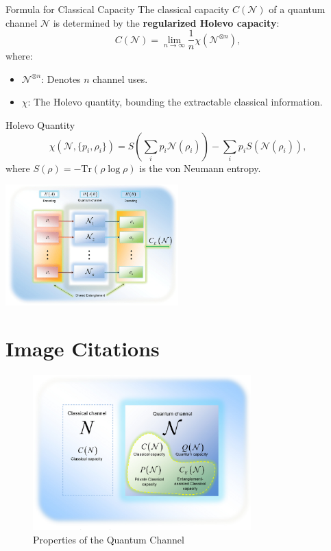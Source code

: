 \begin{frame}{Formula for Classical Capacity}
    The classical capacity \( C(\mathcal{N}) \) of a quantum channel \( \mathcal{N} \) is determined by the \textbf{regularized Holevo capacity}:
    \begin{equation}
        C(\mathcal{N}) = \lim_{n \to \infty} \frac{1}{n} \chi\left(\mathcal{N}^{\otimes n}\right),
    \end{equation}
    where:
    \begin{itemize}
        \item \( \mathcal{N}^{\otimes n} \): Denotes \( n \) channel uses.
        \item \( \chi \): The Holevo quantity, bounding the extractable classical information.
    \end{itemize}

    \begin{block}{Holevo Quantity}
        \[
        \chi(\mathcal{N}, \{p_i, \rho_i\}) = S\left(\sum_i p_i \mathcal{N}(\rho_i)\right) - \sum_i p_i S\left(\mathcal{N}(\rho_i)\right),
        \]
        where \( S(\rho) = -\text{Tr}(\rho \log \rho) \) is the von Neumann entropy.
    \end{block}

    \begin{center}
        \includegraphics[width=0.5\textwidth]{figures/classical_cap.png}
    \end{center}
\end{frame}

\section{Image Citations}
\begin{figure}[h]
    \centering
    \includegraphics[width=0.75\textwidth]{figures/properties_channels.png}
    \caption{Properties of the Quantum Channel \cite{Gyongyosi2012PropertiesOT}}
\end{figure}


